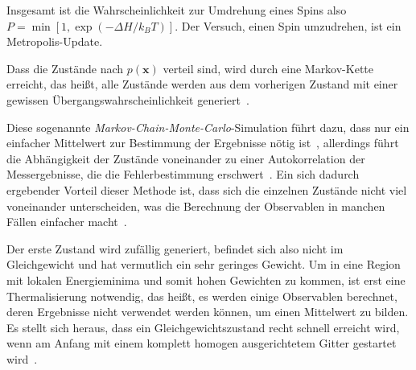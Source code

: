 	Insgesamt ist die Wahrscheinlichkeit zur Umdrehung eines Spins also $P=\min \left[1, \exp(-\Delta H/k_BT)\right]$. Der Versuch, einen Spin umzudrehen, ist ein Metropolis-Update.
	
	Dass die Zustände nach $p(\mathbf{x})$ verteil sind, wird durch eine Markov-Kette erreicht, das heißt, alle Zustände werden aus dem vorherigen Zustand mit einer gewissen Übergangswahrscheinlichkeit generiert~\cite[vgl. ][S. 19 f.]{binderheermann}. 
	
	Diese sogenannte \textit{Markov-Chain-Monte-Carlo}-Simulation führt dazu, dass nur ein einfacher Mittelwert zur Bestimmung der Ergebnisse nötig ist~\cite[vgl. ][S. 19 f.]{binderheermann}, allerdings führt die Abhängigkeit der Zustände voneinander zu einer Autokorrelation der Messergebnisse, die die Fehlerbestimmung erschwert~\cite[vgl. ][S. 72 ff.]{skriptcompphys}. Ein sich dadurch ergebender Vorteil dieser Methode ist, dass sich die einzelnen Zustände nicht viel voneinander unterscheiden, was die Berechnung der Observablen in manchen Fällen einfacher macht~\cite[vgl. ][S. 102 f.]{binderheermann}.
	
	Der erste Zustand wird zufällig generiert, befindet sich also nicht im Gleichgewicht und hat vermutlich ein sehr geringes Gewicht. Um in eine Region mit lokalen Energieminima und somit hohen Gewichten zu kommen, ist erst eine Thermalisierung notwendig, das heißt, es werden einige Observablen berechnet, deren Ergebnisse nicht verwendet werden können, um einen Mittelwert zu bilden. %
	Es stellt sich heraus, dass ein Gleichgewichtszustand recht schnell erreicht wird, wenn am Anfang mit einem komplett homogen ausgerichtetem Gitter gestartet wird~\cite[vgl. ][S. 100 f.]{binderheermann}.
	
	
